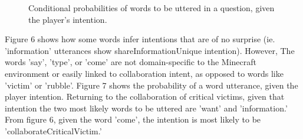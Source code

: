 \begin{figure}[h!]
    \centering
    \caption{Conditional probabilities of words to be uttered in a question, given the player's intention.}
    \end{figure}
    Figure 6 shows how some words infer intentions that are of no surprise (ie. 'information' utterances show shareInformationUnique intention). However, The words 'say', 'type', or 'come' are not domain-specific to the Minecraft environment or easily linked to collaboration intent, as opposed to words like 'victim' or 'rubble'. Figure 7 shows the probability of a word utterance, given the player intention. Returning to the collaboration of critical victims, given that intention the two most likely words to be uttered are 'want' and 'information.' From figure 6, given the word 'come', the intention is most likely to be 'collaborateCriticalVictim.'






